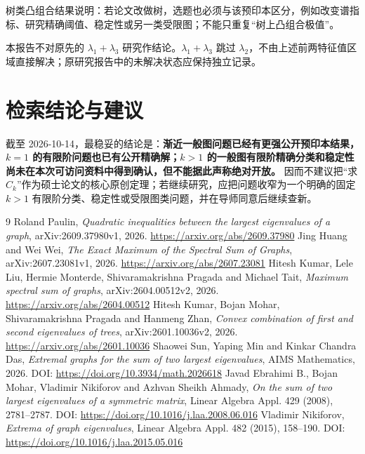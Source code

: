 \documentclass[11pt,a4paper]{article}
\begin{document}
树类凸组合结果说明：若论文改做树，选题也必须与该预印本区分，例如改变谱指标、研究精确阈值、稳定性或另一类受限图；不能只重复“树上凸组合极值”。

本报告不对原先的 $\lambda_1+\lambda_3$ 研究作结论。$\lambda_1+\lambda_3$ 跳过 $\lambda_2$，不由上述前两特征值区域直接解决；原研究报告中的未解决状态应保持独立记录。

\section{检索结论与建议}
截至 2026-10-14，最稳妥的结论是：\textbf{渐近一般图问题已经有更强公开预印本结果，$k=1$ 的有限阶问题也已有公开精确解；$k>1$ 的一般图有限阶精确分类和稳定性尚未在本次可访问资料中得到确认，但不能据此声称绝对开放。} 因而不建议把“求 $C_k$”作为硕士论文的核心原创定理；若继续研究，应把问题收窄为一个明确的固定 $k>1$ 有限阶分类、稳定性或受限图类问题，并在导师同意后继续查新。

\begin{thebibliography}{9}
 Roland Paulin, \emph{Quadratic inequalities between the largest eigenvalues of a graph}, arXiv:2609.37980v1, 2026. \url{https://arxiv.org/abs/2609.37980}
 Jing Huang and Wei Wei, \emph{The Exact Maximum of the Spectral Sum of Graphs}, arXiv:2607.23081v1, 2026. \url{https://arxiv.org/abs/2607.23081}
 Hitesh Kumar, Lele Liu, Hermie Monterde, Shivaramakrishna Pragada and Michael Tait, \emph{Maximum spectral sum of graphs}, arXiv:2604.00512v2, 2026. \url{https://arxiv.org/abs/2604.00512}
 Hitesh Kumar, Bojan Mohar, Shivaramakrishna Pragada and Hanmeng Zhan, \emph{Convex combination of first and second eigenvalues of trees}, arXiv:2601.10036v2, 2026. \url{https://arxiv.org/abs/2601.10036}
 Shaowei Sun, Yaping Min and Kinkar Chandra Das, \emph{Extremal graphs for the sum of two largest eigenvalues}, AIMS Mathematics, 2026. DOI: \url{https://doi.org/10.3934/math.2026618}
 Javad Ebrahimi B., Bojan Mohar, Vladimir Nikiforov and Azhvan Sheikh Ahmady, \emph{On the sum of two largest eigenvalues of a symmetric matrix}, Linear Algebra Appl. 429 (2008), 2781--2787. DOI: \url{https://doi.org/10.1016/j.laa.2008.06.016}
 Vladimir Nikiforov, \emph{Extrema of graph eigenvalues}, Linear Algebra Appl. 482 (2015), 158--190. DOI: \url{https://doi.org/10.1016/j.laa.2015.05.016}
\end{thebibliography}
\end{document}
